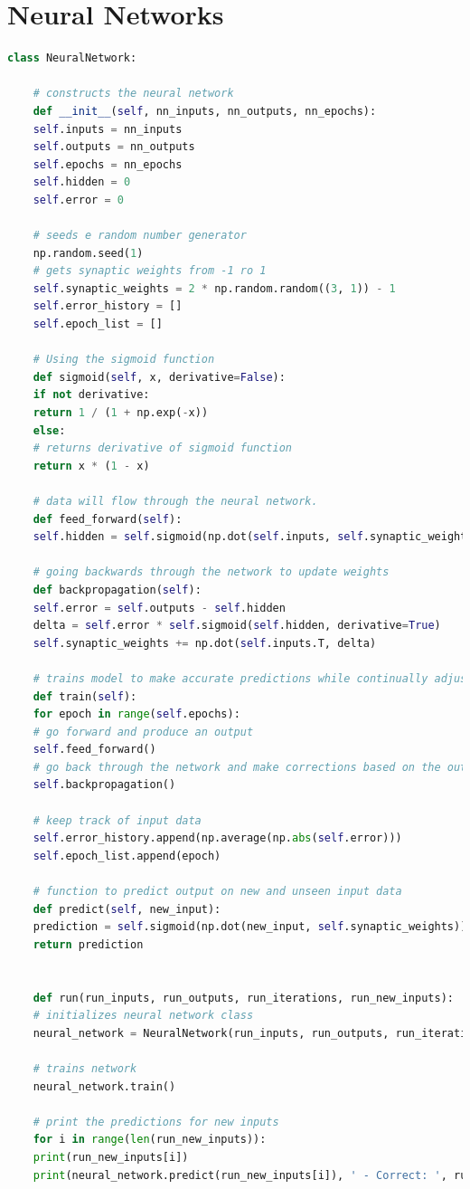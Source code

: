 \documentclass{article}
\begin{document}
	\section{Neural Networks}
	\begin{lstlisting}[language= Python]
	class NeuralNetwork:
	
	# constructs the neural network
	def __init__(self, nn_inputs, nn_outputs, nn_epochs):
	self.inputs = nn_inputs
	self.outputs = nn_outputs
	self.epochs = nn_epochs
	self.hidden = 0
	self.error = 0
	
	# seeds e random number generator
	np.random.seed(1)
	# gets synaptic weights from -1 ro 1
	self.synaptic_weights = 2 * np.random.random((3, 1)) - 1
	self.error_history = []
	self.epoch_list = []
	
	# Using the sigmoid function
	def sigmoid(self, x, derivative=False):
	if not derivative:
	return 1 / (1 + np.exp(-x))
	else:
	# returns derivative of sigmoid function
	return x * (1 - x)
	
	# data will flow through the neural network.
	def feed_forward(self):
	self.hidden = self.sigmoid(np.dot(self.inputs, self.synaptic_weights))
	
	# going backwards through the network to update weights
	def backpropagation(self):
	self.error = self.outputs - self.hidden
	delta = self.error * self.sigmoid(self.hidden, derivative=True)
	self.synaptic_weights += np.dot(self.inputs.T, delta)
	
	# trains model to make accurate predictions while continually adjusting weights
	def train(self):
	for epoch in range(self.epochs):
	# go forward and produce an output
	self.feed_forward()
	# go back through the network and make corrections based on the output
	self.backpropagation()
	
	# keep track of input data
	self.error_history.append(np.average(np.abs(self.error)))
	self.epoch_list.append(epoch)
	
	# function to predict output on new and unseen input data
	def predict(self, new_input):
	prediction = self.sigmoid(np.dot(new_input, self.synaptic_weights))
	return prediction
	
	
	def run(run_inputs, run_outputs, run_iterations, run_new_inputs):
	# initializes neural network class
	neural_network = NeuralNetwork(run_inputs, run_outputs, run_iterations)
	
	# trains network
	neural_network.train()
	
	# print the predictions for new inputs
	for i in range(len(run_new_inputs)):
	print(run_new_inputs[i])
	print(neural_network.predict(run_new_inputs[i]), ' - Correct: ', run_new_inputs[i][0])
	

\end{lstlisting}
\end{document}
